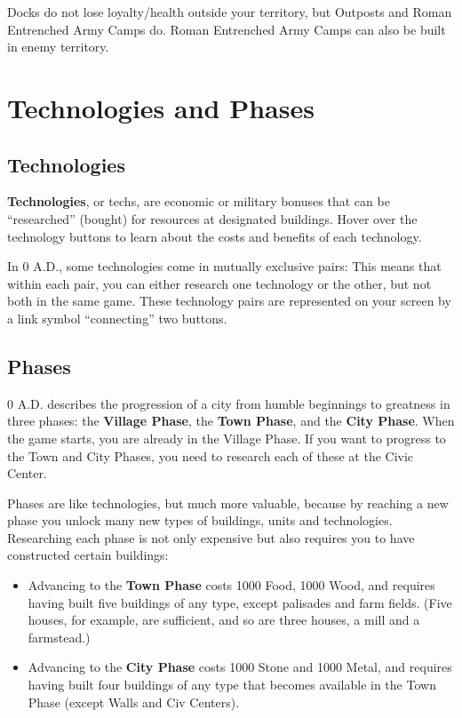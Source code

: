 \documentclass[a4paper,titlepage]{article}
\begin{document}
Docks do not lose loyalty/health outside your territory, but Outposts and Roman Entrenched Army Camps do. Roman Entrenched Army Camps can also be built in enemy territory.

\clearpage

\section{Technologies and Phases}

\subsection*{Technologies}

\textbf{Technologies}, or techs, are economic or military bonuses that can be “researched” (bought) for resources at designated buildings. Hover over the technology buttons to learn about the costs and benefits of each technology.

In 0 A.D., some technologies come in mutually exclusive pairs: This means that within each pair, you can either research one technology or the other, but not both in the same game. These technology pairs are represented on your screen by a link symbol “connecting” two buttons.

\subsection*{Phases}

0 A.D. describes the progression of a city from humble beginnings to greatness in three phases: the \textbf{Village Phase}, the \textbf{Town Phase}, and the \textbf{City Phase}. When the game starts, you are already in the Village Phase. If you want to progress to the Town and City Phases, you need to research each of these at the Civic Center.

Phases are like technologies, but much more valuable, because by reaching a new phase you unlock many new types of buildings, units and technologies. Researching each phase is not only expensive but also requires you to have constructed certain buildings:

\begin{itemize}
\item Advancing to the \textbf{Town Phase} costs 1000 Food, 1000 Wood, and requires having built five buildings of any type, except palisades and farm fields. (Five houses, for example, are sufficient, and so are three houses, a mill and a farmstead.)
\item Advancing to the \textbf{City Phase} costs 1000 Stone and 1000 Metal, and requires having built four buildings of any type that becomes available in the Town Phase (except Walls and Civ Centers).
\end{itemize}
\end{document}
